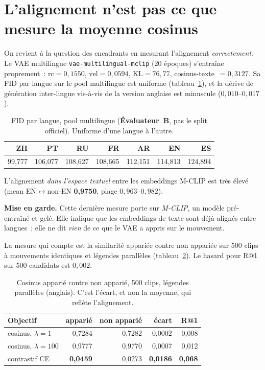 \documentclass[12pt,a4paper,oneside]{report}
\theoremstyle{definition}
\theoremstyle{plain}
\newcommand{\rc}{\mathrm{rc}}
\newcommand{\vel}{\mathrm{vel}}
\newcommand{\KL}{\mathrm{KL}}
\begin{document}
\section{L'alignement n'est pas ce que mesure la moyenne cosinus}
\label{sec:cosfail}

On revient à la question des encadrants en mesurant l'alignement \emph{correctement}.
Le VAE multilingue \texttt{vae-multilingual-mclip} (20 époques) s'entraîne
proprement~: $\rc=0{,}1550$, $\vel=0{,}0594$, $\KL=76{,}77$,
cosinus-texte~$=0{,}3127$. Sa FID par langue sur le pool multilingue est uniforme
(tableau~\ref{tab:perlangfid}), et la dérive de génération inter-lingue vis-à-vis
de la version anglaise est minuscule ($0{,}010$--$0{,}017$).

\begin{table}[ht]
\centering
\caption{FID par langue, pool multilingue (\textbf{Évaluateur~B}, pas le split
officiel). Uniforme d'une langue à l'autre.}
\label{tab:perlangfid}
\small
\begin{tabular}{@{}rrrrrrr@{}}
\toprule
ZH & PT & RU & FR & AR & EN & ES \\
\midrule
99,777 & 106,077 & 108,627 & 108,665 & 112,151 & 114,813 & 124,894 \\
\bottomrule
\end{tabular}
\end{table}

L'alignement \emph{dans l'espace textuel} entre les embeddings M-CLIP est très
élevé (mean EN$\leftrightarrow$non-EN \textbf{0,9750}, plage $0{,}963$--$0{,}982$).

\begin{encadre}
\textbf{Mise en garde.} Cette dernière mesure porte sur \emph{M-CLIP}, un modèle
pré-entraîné et gelé. Elle indique que les embeddings de texte sont déjà alignés
entre langues~; elle ne dit \emph{rien} de ce que le VAE a appris sur le mouvement.
\end{encadre}

La mesure qui compte est la similarité appariée contre non appariée sur 500 clips
à mouvements identiques et légendes parallèles (tableau~\ref{tab:matched}). Le
hasard pour R@1 sur 500 candidats est $0{,}002$.

\begin{table}[ht]
\centering
\caption{Cosinus apparié contre non apparié, 500 clips, légendes parallèles
(anglais). C'est l'écart, et non la moyenne, qui reflète l'alignement.}
\label{tab:matched}
\small
\begin{tabular}{@{}lrrrr@{}}
\toprule
Objectif & apparié & non apparié & \textbf{écart} & R@1 \\
\midrule
cosinus, $\lambda=1$   & 0,7284 & 0,7282 & 0,0002 & 0,008 \\
cosinus, $\lambda=100$ & 0,9777 & 0,9770 & 0,0007 & 0,012 \\
contrastif CE          & \textbf{0,0459} & 0,0273 & \textbf{0,0186} & \textbf{0,068} \\
\bottomrule
\end{tabular}
\end{table}
\end{document}
